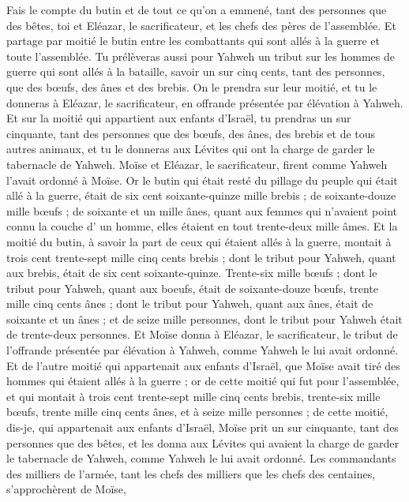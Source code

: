 \begin{multicols}{2}
Fais le compte du butin et de tout ce qu'on a emmené, tant des personnes que des bêtes, toi et Eléazar, le sacrificateur, et les chefs des pères de l'assemblée.
Et partage par moitié le butin entre les combattants qui sont allés à la guerre et toute l'assemblée.
Tu prélèveras aussi pour Yahweh un tribut sur les hommes de guerre qui sont allés à la bataille, savoir un sur cinq cents, tant des personnes, que des bœufs, des ânes et des brebis.
On le prendra sur leur moitié, et tu le donneras à Eléazar, le sacrificateur, en offrande présentée par élévation à Yahweh.
Et sur la moitié qui appartient aux enfants d'Israël, tu prendras un sur cinquante, tant des personnes que des bœufs, des ânes, des brebis et de tous autres animaux, et tu le donneras aux Lévites qui ont la charge de garder le tabernacle de Yahweh.
Moïse et Eléazar, le sacrificateur, firent comme Yahweh l'avait ordonné à Moïse.
Or le butin qui était resté du pillage du peuple qui était allé à la guerre, était de six cent soixante-quinze mille brebis ;
de soixante-douze mille bœufs ;
de soixante et un mille ânes,
quant aux femmes qui n'avaient point connu la couche d' un homme, elles étaient en tout trente-deux mille âmes.
Et la moitié du butin, à savoir la part de ceux qui étaient allés à la guerre, montait à trois cent trente-sept mille cinq cents brebis ;
dont le tribut pour Yahweh, quant aux brebis, était de six cent soixante-quinze.
Trente-six mille bœufs ; dont le tribut pour Yahweh, quant aux boeufs, était de soixante-douze bœufs,
trente mille cinq cents ânes ; dont le tribut pour Yahweh, quant aux ânes, était de soixante et un ânes ;
et de seize mille personnes, dont le tribut pour Yahweh était de trente-deux personnes.
Et Moïse donna à Eléazar, le sacrificateur, le tribut de l'offrande présentée par élévation à Yahweh, comme Yahweh le lui avait ordonné.
Et de l'autre moitié qui appartenait aux enfants d'Israël, que Moïse avait tiré des hommes qui étaient allés à la guerre ;
or de cette moitié qui fut pour l'assemblée, et qui montait à trois cent trente-sept mille cinq cents brebis,
trente-six mille bœufs,
trente mille cinq cents ânes,
et à seize mille personnes ;
de cette moitié, dis-je, qui appartenait aux enfants d'Israël, Moïse prit un sur cinquante, tant des personnes que des bêtes, et les donna aux Lévites qui avaient la charge de garder le tabernacle de Yahweh, comme Yahweh le lui avait ordonné.
Les commandants des milliers de l'armée, tant les chefs des milliers que les chefs des centaines, s'approchèrent de Moïse,

\end{multicols}

